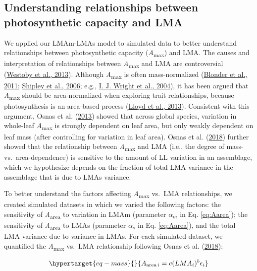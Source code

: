 \documentclass[
  12pt,
  a4paper,
,tablecaptionabove
]{scrartcl}
\begin{document}
\hypertarget{understanding-relationships-between-photosynthetic-capacity-and-lma}{%
\subsection{Understanding relationships between photosynthetic capacity
and
LMA}\label{understanding-relationships-between-photosynthetic-capacity-and-lma}}

We applied our LMAm-LMAs model to simulated data to better understand
relationships between photosynthetic capacity
(\emph{A}\textsubscript{max}) and LMA. The causes and interpretation of
relationships between \emph{A}\textsubscript{max} and LMA are
controversial (\protect\hyperlink{ref-Westoby2013}{Westoby et al.,
2013}). Although \emph{A}\textsubscript{max} is often mass-normalized
(\protect\hyperlink{ref-Blonder2011}{Blonder et al., 2011};
\protect\hyperlink{ref-Shipley2006}{Shipley et al., 2006}; e.g.,
\protect\hyperlink{ref-Wright2004a}{I. J. Wright et al., 2004}), it has
been argued that \emph{A}\textsubscript{max} should be area-normalized
when exploring trait relationships, because photosynthesis is an
area-based process (\protect\hyperlink{ref-Lloyd2013}{Lloyd et al.,
2013}). Consistent with this argument, Osnas et al.
(\protect\hyperlink{ref-Osnas2013}{2013}) showed that across global
species, variation in whole-leaf \emph{A}\textsubscript{max} is strongly
dependent on leaf area, but only weakly dependent on leaf mass (after
controlling for variation in leaf area). Osnas et al.
(\protect\hyperlink{ref-Osnas2018}{2018}) further showed that the
relationship between \emph{A}\textsubscript{max} and LMA (i.e., the
degree of mass- vs.~area-dependence) is sensitive to the amount of LL
variation in an assemblage, which we hypothesize depends on the fraction
of total LMA variance in the assemblage that is due to LMAs variance.

To better understand the factors affecting \emph{A}\textsubscript{max}
vs.~LMA relationships, we created simulated datasets in which we varied
the following factors: the sensitivity of \emph{A}\textsubscript{area}
to variation in LMAm (parameter \(\alpha_m\) in Eq. \ref{eq:Aarea}); the
sensitivity of \emph{A}\textsubscript{area} to LMAs (parameter
\(\alpha_s\) in Eq. \ref{eq:Aarea}), and the total LMA variance due to
variance in LMAs. For each simulated dataset, we quantified the
\emph{A}\textsubscript{max} vs.~LMA relationship following Osnas et al.
(\protect\hyperlink{ref-Osnas2018}{2018}):

\begin{equation}\protect\hypertarget{eq-mass}{}{
A_{\mathrm{area} \, i} = c (LMA_i)^{b}\epsilon_i
}\label{eq-mass}\end{equation}
\end{document}
